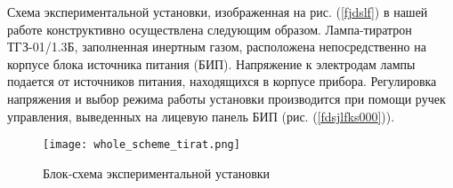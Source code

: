 Схема экспериментальной установки, изображенная на рис. (\ref{fjdslf}) в нашей
работе конструктивно осуществлена следующим образом. Лампа-тиратрон ТГЗ-01/1.3Б,
заполненная инертным газом, расположена непосредственно на корпусе блока
источника питания (БИП). Напряжение к электродам лампы подается от источников
питания, находящихся в корпусе прибора. Регулировка напряжения и выбор режима
работы установки производится при помощи ручек управления, выведенных на лицевую
панель БИП (рис. (\ref{fdsjlfks000})).

\begin{figure}[h!]
  \centering
  \texttt{[image: whole\_scheme\_tirat.png]}
  \caption{ {Блок-схема экспериментальной установки}}
  \label{img::whole_tirat}
\end{figure}
